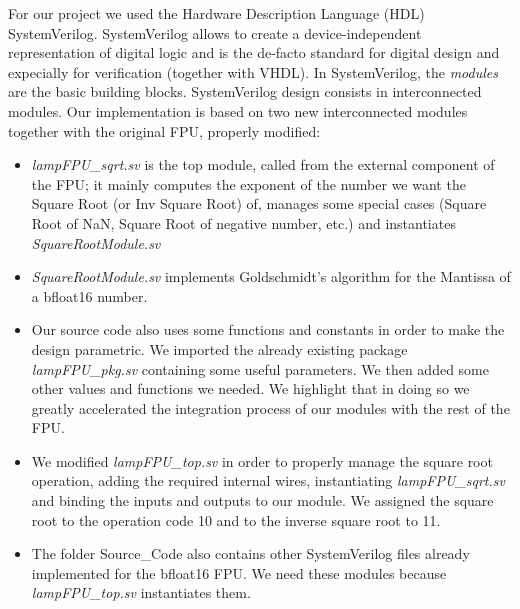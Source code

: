 For our project we used the Hardware Description Language (HDL) SystemVerilog. SystemVerilog allows to create a device-independent representation of digital logic and is the de-facto standard for digital design and expecially for verification (together with VHDL). 
In SystemVerilog, the \emph{modules} are the basic building blocks. SystemVerilog design consists in interconnected modules.
Our implementation is based on two new interconnected modules together with the original FPU, properly modified:

\begin{itemize}
\item \emph{lampFPU\_sqrt.sv} is the top module, called from the external component of the FPU; it mainly computes the exponent of the number we want the Square Root (or Inv Square Root) of, manages some special cases (Square Root of NaN, Square Root of negative number, etc.) and instantiates \emph{SquareRootModule.sv}
\item \emph{SquareRootModule.sv} implements Goldschmidt's algorithm for the Mantissa of a bfloat16 number. 
\item Our source code also uses some functions and constants in order to make the design parametric. We imported the already existing package \emph{lampFPU\_pkg.sv} containing some useful parameters. We then added some other values and functions we needed. We highlight that in doing so we greatly accelerated the integration process of our modules with the rest of the FPU.
\item We modified \emph{lampFPU\_top.sv} in order to properly manage the square root operation, adding the required internal wires, instantiating \emph{lampFPU\_sqrt.sv} and binding the inputs and outputs to our module. We assigned the square root to the operation code 10 and to the inverse square root to 11. 
\item The folder Source\_Code also contains other SystemVerilog files already implemented for the bfloat16 FPU. We need these modules because \emph{lampFPU\_top.sv} instantiates them.
\end{itemize}

